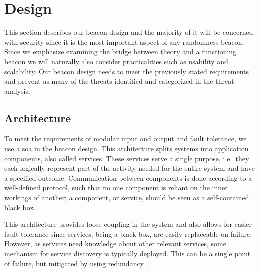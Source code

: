 \section{Design}\label{sec:design}

This section describes our beacon design and the majority of it will be concerned with security since it is the most important aspect of any randomness beacon. Since we emphasize examining the bridge between theory and a functioning beacon we will naturally also consider practicalities such as usability and scalability.
Our beacon design needs to meet the previously stated requirements and prevent as many of the threats identified and categorized in the threat analysis.

\subsection{Architecture}\label{sec:design_architecture}
To meet the requirements of modular input and output and fault tolerance, we use a \gls{soa} in the beacon design.
This architecture splits systems into application components, also called services.
These services serve a single purpose, i.e.\ they each logically represent part of the activity needed for the entire system and have a specified outcome.
Communication between components is done according to a well-defined protocol, such that no one component is reliant on the inner workings of another;
a component, or service, should be seen as a self-contained black box.

This architecture provides loose coupling in the system and also allows for easier fault tolerance since services, being a black box, are easily replaceable on failure.
However, as services need knowledge about other relevant services, some mechanism for service discovery is typically deployed.
This can be a single point of failure, but mitigated by using redundancy~\cite{soa_redundancy}.
